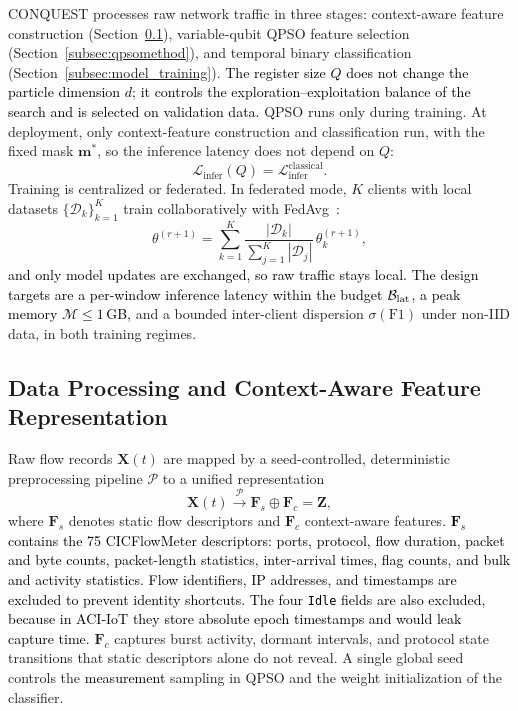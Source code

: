 \documentclass[conference]{IEEEtran}
\begin{document}
CONQUEST processes raw network traffic in three stages:
context-aware feature construction
(Section~\ref{subsec:feature_pipeline}), variable-qubit QPSO feature
selection (Section~\ref{subsec:qpsomethod}), and temporal binary
classification (Section~\ref{subsec:model_training}).
\textcolor{black}{The register size $Q$ does not change the
particle dimension $d$; it controls the exploration--exploitation
balance of the search and is selected on validation data.} QPSO runs
only during training. At deployment, only context-feature construction and
classification run, with the fixed mask $\mathbf{m}^{*}$, so the
inference latency does not depend on $Q$:
\begin{equation}
\mathcal{L}_{\text{infer}}(Q) =
\mathcal{L}_{\text{infer}}^{\text{classical}}.
\label{eq:infer_invariance}
\end{equation}
Training is centralized or federated. In federated mode, $K$ clients
with local datasets $\{\mathcal{D}_k\}_{k=1}^{K}$ train
collaboratively with FedAvg~\cite{mcmahan2017fedavg}:
\begin{equation}
\theta^{(r+1)} = \sum_{k=1}^{K}
\frac{|\mathcal{D}_k|}{\sum_{j=1}^{K}|\mathcal{D}_j|}
\,\theta_k^{(r+1)},
\label{eq:fedavg_overview}
\end{equation}
\textcolor{black}{and only model updates are exchanged, so raw
traffic stays local.} \textcolor{black}{The design targets are
a per-window inference latency within the budget
$\mathcal{B}_{\rm lat}$, a peak memory $\mathcal{M}\le1$\,GB,} and a
bounded inter-client dispersion $\sigma(\mathrm{F1})$ under non-IID
data, in both training regimes.


\subsection{Data Processing and Context-Aware Feature
            Representation}
\label{subsec:feature_pipeline}

Raw flow records $\mathbf{X}(t)$ are mapped by a seed-controlled,
deterministic preprocessing pipeline $\mathcal{P}$ to a unified
representation
\begin{equation}
\mathbf{X}(t) \xrightarrow{\mathcal{P}}
\mathbf{F}_s \oplus \mathbf{F}_c = \mathbf{Z},
\label{eq:feature_fusion}
\end{equation}
where $\mathbf{F}_s$ denotes static flow descriptors and
$\mathbf{F}_c$ context-aware features.
\textcolor{black}{$\mathbf{F}_s$ contains the 75 CICFlowMeter
descriptors: ports, protocol, flow duration, packet and byte counts,
packet-length statistics, inter-arrival times, flag counts, and bulk
and activity statistics. Flow identifiers, IP addresses, and
timestamps are excluded to prevent identity shortcuts. The four
\texttt{Idle} fields are also excluded, because in ACI-IoT they store
absolute epoch timestamps and would leak capture time.}
$\mathbf{F}_c$ captures burst activity, dormant intervals, and
protocol state transitions that static descriptors alone do not
reveal. A single global seed controls the
\textcolor{black}{measurement} sampling in QPSO and the
weight initialization of the classifier.
\end{document}

